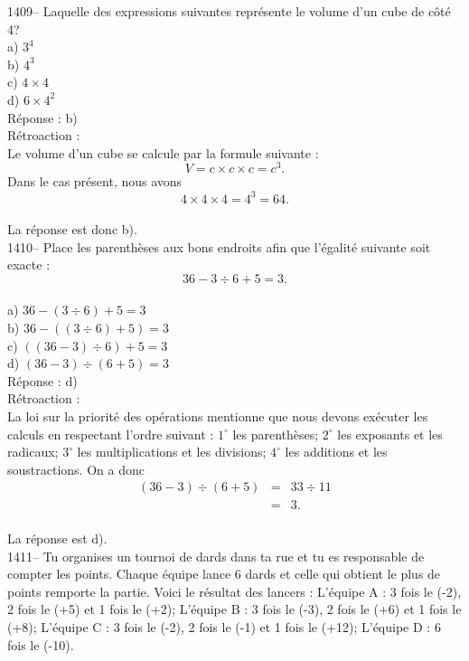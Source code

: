 1409-- Laquelle des expressions suivantes repr\'esente le volume d'un
cube de
c\^ot\'e 4?\\
a) $3^4$\\
b) $4^3$\\
c) $4\times4$\\
d) $6\times4^2$\\

R\'eponse : b)\\

R\'etroaction :\\
Le volume d'un cube se calcule par la formule suivante :
$$V=c\times c\times c=c^3.$$
Dans le cas pr\'esent, nous avons
$$4\times4\times4=4^3=64.$$\\
La r\'eponse est donc b).\\

1410-- Place les parenth\`eses aux bons endroits afin que
l'\'egalit\'e suivante soit exacte :
$$36-3\div6+5=3.$$\\
a) $36-(3\div6)+5=3$\\
b) $36-((3\div6)+5)=3$\\
c) $((36-3)\div6)+5=3$\\
d) $(36-3)\div(6+5)=3$\\

R\'eponse : d)\\

R\'etroaction :\\
La loi sur la priorit\'e des op\'erations mentionne que nous devons
ex\'ecuter les calculs en respectant l'ordre suivant : \vskip 10pt
$1^{\circ}$ les parenth\`eses; \vskip 10pt $2^{\circ}$ les exposants
et les radicaux; \vskip 10pt $3^{\circ}$ les multiplications et les
divisions; \vskip 10pt $4^{\circ}$ les additions et les
soustractions. \vskip 25pt \noindent On a donc
\begin{eqnarray*}
(36-3)\div(6+5)&=&33\div11\\&=&3.
\end{eqnarray*}\\
La r\'eponse est d).\\

1411-- Tu organises un tournoi de dards dans ta rue et tu es
responsable de compter les points. Chaque \'equipe lance 6 dards et
celle qui obtient le plus de points remporte la partie. Voici le
r\'esultat des lancers : \vskip10pt L'\'equipe A : 3 fois le (-2), 2
fois le (+5) et 1 fois le (+2); \vskip 10pt L'\'equipe B : 3 fois le
(-3), 2 fois le (+6) et 1 fois le (+8); \vskip 10pt L'\'equipe C : 3
fois le (-2), 2 fois le (-1) et 1 fois le (+12); \vskip 10pt
L'\'equipe D : 6 fois le (-10).\\

